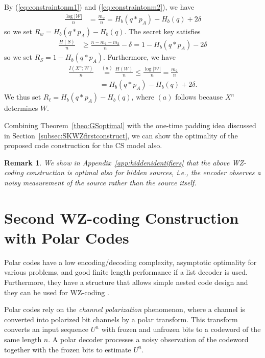 \documentclass[journal,10pt,twoside]{IEEEtran}
\newtheorem{remark}{Remark}
\begin{document}
\begin{IEEEproof}
	By (\ref{eq:constraintonm1}) and (\ref{eq:constraintonm2}), we have 
	\begin{align}
	\frac{\log|\mathcal{W}|}{n}&\!=\!\frac{m_2}{n}\!=\!H_b(q*p_A) \!-\! H_b(q)+2\delta 
	\end{align} 
	so we set $R_w= H_b(q*p_A) - H_b(q)$. The secret key satisfies
	\begin{align}
	\frac{H(S)}{n}&\geq\frac{n-m_1-m_2}{n}-\delta=1- H_b(q*p_A)-2\delta
	\end{align}
	so we set $R_S= 1- H_b(q*p_A)$.	Furthermore, we have
	\begin{align}
	\frac{I(X^n;W)}{n}&\stackrel{(a)}{=} \frac{H(W)}{n}\leq\frac{\log|\mathcal{W}|}{n}=\frac{m_2}{n}\nonumber\\
	&=H_b(q*p_A) - H_b(q)+2\delta.
	\end{align}
	We thus set $R_\ell= H_b(q*p_A) - H_b(q)$, where $(a)$ follows because $X^n$ determines $W$.
\end{IEEEproof}

Combining Theorem~\ref{theo:GSoptimal} with the one-time padding idea discussed in Section~\ref{subsec:SKWZfirstconstruct}, we can show the optimality of the proposed code construction for the CS model also. 

\begin{remark}
	We show in Appendix~\ref{app:hiddenidentifiers} that the above WZ-coding construction is optimal also for hidden sources, i.e., the encoder observes a noisy measurement of the source rather than the source itself.
\end{remark} 

\section{Second WZ-coding Construction with Polar Codes}\label{sec:codeproposal}
Polar codes \cite{Arikan} have a low encoding/decoding complexity, asymptotic optimality for various problems, and good finite length performance if a list decoder is used. Furthermore, they have a structure that allows simple nested code design and they can be used for WZ-coding \cite{RudigerPolarExtended}. 

Polar codes rely on the \textit{channel polarization} phenomenon, where a channel is converted into polarized bit channels by a polar transform. This transform converts an input sequence $U^n$ with frozen and unfrozen bits to a codeword of the same length $n$. A polar decoder processes a noisy observation of the codeword together with the frozen bits to estimate ${U}^n$.
\end{document}
